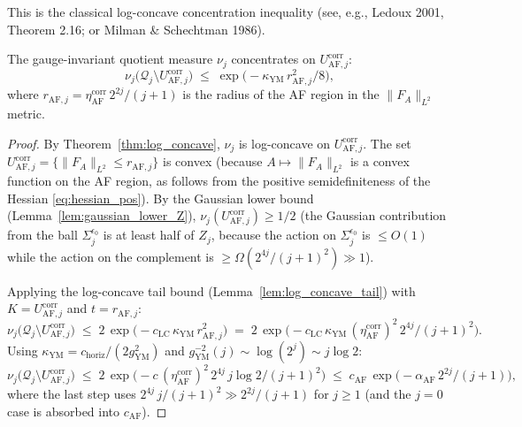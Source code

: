 This is the classical log-concave concentration inequality (see,
e.g., Ledoux 2001, Theorem 2.16; or Milman \& Schechtman 1986).

\begin{corollary}
\label{cor:af_concentration}
The gauge-invariant quotient measure $\nu_{j}$ concentrates on
$U_{\mathrm{AF},j}^{\mathrm{corr}}$:
\begin{equation}
\label{eq:af_concentration}
  \nu_{j}\bigl(\mathcal{Q}_{j}\setminus U_{\mathrm{AF},j}^{\mathrm{
  corr}}\bigr)
  \;\le\;\exp\!\bigl(-\kappa_{\mathrm{YM}}\,r_{\mathrm{AF},j}^{2}/8\bigr),
\end{equation}
where $r_{\mathrm{AF},j}=\eta_{\mathrm{AF}}^{\mathrm{corr}}\,
2^{2j}/(j+1)$ is the radius of the AF region in the $\|F_{A}\|_{L^{2}}$
metric.
\end{corollary}

\begin{proof}
By Theorem~\ref{thm:log_concave}, $\nu_{j}$ is log-concave on
$U_{\mathrm{AF},j}^{\mathrm{corr}}$. The set
$U_{\mathrm{AF},j}^{\mathrm{corr}}=\{\|F_{A}\|_{L^{2}}\le r_{\mathrm{
AF},j}\}$ is convex (because $A\mapsto\|F_{A}\|_{L^{2}}$ is a convex
function on the AF region, as follows from the positive semidefiniteness
of the Hessian \eqref{eq:hessian_pos}). By the Gaussian lower bound
(Lemma~\ref{lem:gaussian_lower_Z}), $\nu_{j}(U_{\mathrm{AF},j}^{
\mathrm{corr}})\ge 1/2$ (the Gaussian contribution from the ball
$\Sigma_{j}^{\epsilon_{0}}$ is at least half of $Z_{j}$, because the
action on $\Sigma_{j}^{\epsilon_{0}}$ is $\le O(1)$ while the action
on the complement is $\ge\Omega(2^{4j}/(j+1)^{2})\gg 1$).

Applying the log-concave tail bound (Lemma~\ref{lem:log_concave_tail})
with $K=U_{\mathrm{AF},j}^{\mathrm{corr}}$ and $t=r_{\mathrm{AF},j}$:
\begin{equation*}
  \nu_{j}\bigl(\mathcal{Q}_{j}\setminus U_{\mathrm{AF},j}^{\mathrm{
  corr}}\bigr)
  \;\le\;2\,\exp\!\bigl(-c_{\mathrm{LC}}\,\kappa_{\mathrm{YM}}\,
  r_{\mathrm{AF},j}^{2}\bigr)
  \;=\;2\,\exp\!\bigl(-c_{\mathrm{LC}}\,\kappa_{\mathrm{YM}}\,
  (\eta_{\mathrm{AF}}^{\mathrm{corr}})^{2}\,2^{4j}/(j+1)^{2}\bigr).
\end{equation*}
Using $\kappa_{\mathrm{YM}}=c_{\mathrm{horiz}}/(2g_{\mathrm{YM}}^{2})$
and $g_{\mathrm{YM}}^{-2}(j)\sim\log(2^{j})\sim j\log 2$:
\begin{equation*}
  \nu_{j}\bigl(\mathcal{Q}_{j}\setminus U_{\mathrm{AF},j}^{\mathrm{
  corr}}\bigr)
  \;\le\;2\,\exp\!\bigl(-c\,(\eta_{\mathrm{AF}}^{\mathrm{corr}})^{2}\,
  2^{4j}\,j\log 2/(j+1)^{2}\bigr)
  \;\le\;c_{\mathrm{AF}}\,\exp\!\bigl(-\alpha_{\mathrm{AF}}\,
  2^{2j}/(j+1)\bigr),
\end{equation*}
where the last step uses $2^{4j}\,j/(j+1)^{2}\gg 2^{2j}/(j+1)$ for
$j\ge 1$ (and the $j=0$ case is absorbed into $c_{\mathrm{AF}}$).
\end{proof}

